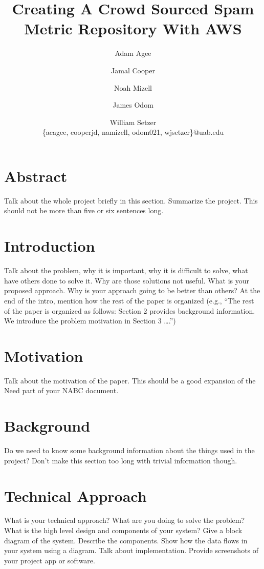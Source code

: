 \documentclass[11pt]{article}
\title{Creating A Crowd Sourced Spam Metric Repository With AWS}
\author{Adam Agee \and Jamal Cooper \and Noah Mizell \and James Odom \and William Setzer \\ \{acagee, cooperjd, namizell, odom021, wjsetzer\}@uab.edu}
\begin{document}
\maketitle


\begin{multicols}{2}

  \section*{Abstract}

  Talk about the whole project briefly in this section. Summarize the project. This should not be more than five or six sentences long.

  \section{Introduction} 

Talk about the problem, why it is important, why it is difficult to solve, what have others done to solve it. Why are those solutions not useful. What is your proposed approach. Why is your approach going to be better than others?
 At the end of the intro, mention how the rest of the paper is organized (e.g., “The rest of the paper is organized as follows: Section 2 
provides background information. We introduce the problem motivation in Section 3 ….”)

  \section{Motivation}
 Talk about the motivation of the paper. This should be a good expansion of the Need part of your NABC document.
 
  \section{Background}
Do we need to know some background information about the things used in the project? Don’t make this section too long with trivial information though.

  \section{Technical Approach}
What is your technical approach? What are you doing to solve the problem? What is the high level design and components of your system? Give a block diagram of the system. Describe the components. Show how the data flows in your system using a diagram. Talk about implementation. Provide screenshots of your project app or software.


\end{multicols}
\end{document}
